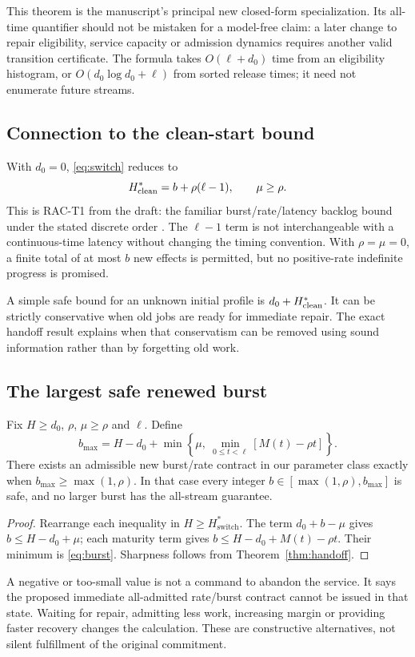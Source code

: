 This theorem is the manuscript's principal new closed-form specialization. Its all-time quantifier should not be mistaken for a model-free claim: a later change to repair eligibility, service capacity or admission dynamics requires another valid transition certificate. The formula takes $O(\ell+d_0)$ time from an eligibility histogram, or $O(d_0\log d_0+\ell)$ from sorted release times; it need not enumerate future streams.

\subsection{Connection to the clean-start bound}
With $d_0=0$, \cref{eq:switch} reduces to
\begin{equation}
H^*_{\rm clean}=b+\rho(\ell-1),\qquad \mu\ge\rho.
\label{eq:clean}
\end{equation}
This is RAC-T1 from the draft: the familiar burst/rate/latency backlog bound under the stated discrete order \cite{netcal,draft}. The $\ell-1$ term is not interchangeable with a continuous-time latency without changing the timing convention. With $\rho=\mu=0$, a finite total of at most $b$ new effects is permitted, but no positive-rate indefinite progress is promised.

A simple safe bound for an unknown initial profile is $d_0+H^*_{\rm clean}$. It can be strictly conservative when old jobs are ready for immediate repair. The exact handoff result explains when that conservatism can be removed using sound information rather than by forgetting old work.

\subsection{The largest safe renewed burst}
\begin{corollary}
\label{cor:burst}
Fix $H\ge d_0$, $\rho$, $\mu\ge\rho$ and $\ell$. Define
\begin{equation}
\boxed{b_{\max}=H-d_0+\min\left\{\mu,\
\min_{0\le t<\ell}[M(t)-\rho t]\right\}.}
\label{eq:burst}
\end{equation}
There exists an admissible new burst/rate contract in our parameter class exactly when $b_{\max}\ge\max(1,\rho)$. In that case every integer $b\in[\max(1,\rho),b_{\max}]$ is safe, and no larger burst has the all-stream guarantee.
\end{corollary}
\begin{proof}
Rearrange each inequality in $H\ge H^*_{\mathrm{switch}}$. The term $d_0+b-\mu$ gives $b\le H-d_0+\mu$; each maturity term gives $b\le H-d_0+M(t)-\rho t$. Their minimum is \cref{eq:burst}. Sharpness follows from Theorem~\ref{thm:handoff}.
\end{proof}
A negative or too-small value is not a command to abandon the service. It says the proposed immediate all-admitted rate/burst contract cannot be issued in that state. Waiting for repair, admitting less work, increasing margin or providing faster recovery changes the calculation. These are constructive alternatives, not silent fulfillment of the original commitment.

